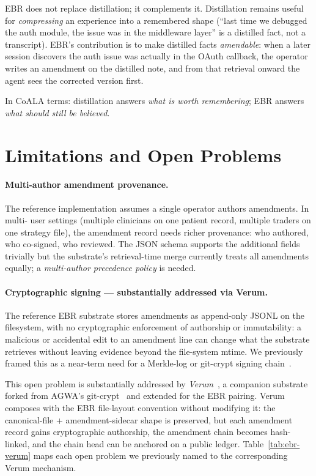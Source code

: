 \documentclass[11pt,a4paper]{article}
\begin{document}
\noindent
EBR does not replace distillation; it complements it. Distillation remains useful for
\emph{compressing} an experience into a remembered shape (``last time we debugged the
auth module, the issue was in the middleware layer'' is a distilled fact, not a
transcript). EBR's contribution is to make distilled facts \emph{amendable}: when a
later session discovers the auth issue was actually in the OAuth callback, the operator
writes an amendment on the distilled note, and from that retrieval onward the agent
sees the corrected version first.

In CoALA terms: distillation answers \emph{what is worth remembering}; EBR answers
\emph{what should still be believed}.

\section{Limitations and Open Problems}
\label{sec:limits}

\paragraph{Multi-author amendment provenance.}
The reference implementation assumes a single operator authors amendments. In multi-
user settings (multiple clinicians on one patient record, multiple traders on one
strategy file), the amendment record needs richer provenance: who authored, who
co-signed, who reviewed. The JSON schema supports the additional fields trivially but
the substrate's retrieval-time merge currently treats all amendments equally; a
\emph{multi-author precedence policy} is needed.

\paragraph{Cryptographic signing --- substantially addressed via Verum.}
\label{para:verum}
The reference EBR substrate stores amendments as append-only JSONL on the
filesystem, with no cryptographic enforcement of authorship or immutability:
a malicious or accidental edit to an amendment line can change what the
substrate retrieves without leaving evidence beyond the file-system mtime.
We previously framed this as a near-term need for a Merkle-log or git-crypt
signing chain~\cite{shamir1979,gitcrypt2021}.

This open problem is substantially addressed by \emph{Verum}~\cite{verum2026},
a companion substrate forked from AGWA's git-crypt~\cite{gitcrypt2021} and
extended for the EBR pairing. Verum composes with the EBR file-layout
convention without modifying it: the canonical-file + amendment-sidecar
shape is preserved, but each amendment record gains cryptographic
authorship, the amendment chain becomes hash-linked, and the chain head
can be anchored on a public ledger. Table~\ref{tab:ebr-verum} maps each
open problem we previously named to the corresponding Verum mechanism.
\end{document}
